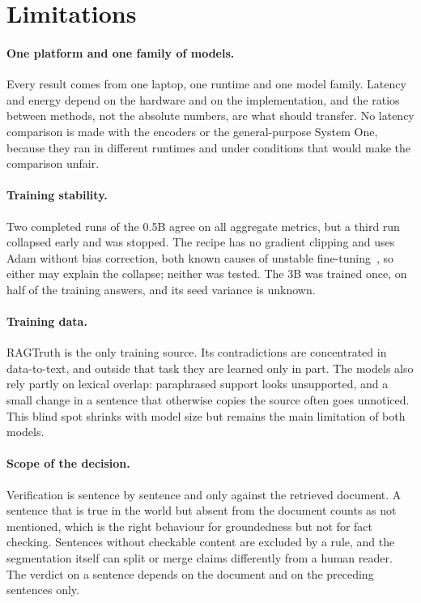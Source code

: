 \section{Limitations}
\label{sec:disc-limitations}

\paragraph{One platform and one family of models.} Every result comes from one laptop, one runtime and one model
family. Latency and energy depend on the hardware and on the implementation, and the ratios between methods, not the
absolute numbers, are what should transfer. No latency comparison is made with the encoders or the general-purpose System
One, because they ran in different runtimes and under conditions that would make the comparison unfair.

\paragraph{Training stability.} Two completed runs of the 0.5B agree on all aggregate metrics, but a third run collapsed
early and was stopped. The recipe has no gradient clipping and uses Adam without bias correction, both known causes of
unstable fine-tuning~\cite{pascanu2013difficulty,mosbach2021stability}, so either may explain the collapse; neither was
tested. The 3B was trained once, on half of the training answers, and its seed variance is unknown.

\paragraph{Training data.} RAGTruth is the only training source. Its contradictions are concentrated in data-to-text,
and outside that task they are learned only in part. The models also rely partly on lexical overlap: paraphrased support
looks unsupported, and a small change in a sentence that otherwise copies the source often goes unnoticed. This blind
spot shrinks with model size but remains the main limitation of both models.

\paragraph{Scope of the decision.} Verification is sentence by sentence and only against the retrieved document. A
sentence that is true in the world but absent from the document counts as not mentioned, which is the right behaviour for
groundedness but not for fact checking. Sentences without checkable content are excluded by a rule, and the segmentation
itself can split or merge claims differently from a human reader. The verdict on a sentence depends on the document and on
the preceding sentences only.


